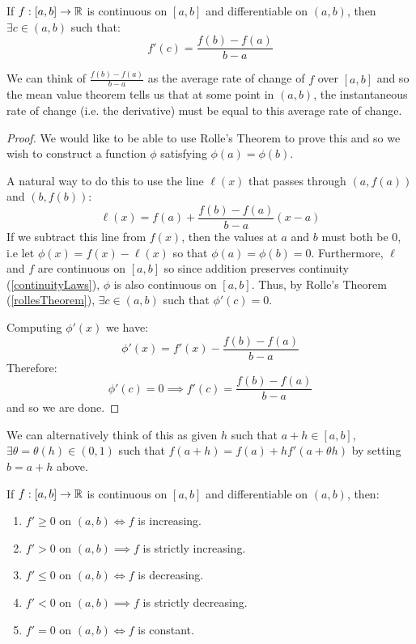 \documentclass[../main.tex]{subfiles}
\begin{document}
\begin{theorem}
  If $f: [a, b] \to \mathbb{R}$ is continuous on $[a, b]$ and differentiable on $(a, b)$, then $\exists c \in (a, b)$ such that:
  \label{MVT}
  \[
    f'(c) = \frac{f(b) - f(a)}{b - a}
  \]
\end{theorem}
\begin{remark}[Intuition]
  We can think of $\frac{f(b) - f(a)}{b - a}$ as the average rate of change of $f$ over $[a, b]$ and so the mean value theorem tells us that at some point in $(a, b)$, the instantaneous rate of change (i.e. the derivative) must be equal to this average rate of change.
\end{remark}
\begin{proof}
  We would like to be able to use Rolle's Theorem to prove this and so we wish to construct a function $\phi$ satisfying $\phi(a) = \phi(b)$.

  A natural way to do this to use the line $\ell(x)$ that passes through $(a, f(a))$ and $(b, f(b))$:
  \[
    \ell(x) = f(a) + \frac{f(b) - f(a)}{b - a}(x - a)
  \]
  If we subtract this line from $f(x)$, then the values at $a$ and $b$ must both be 0, i.e let $\phi(x) = f(x) - \ell(x)$ so that $\phi(a) = \phi(b) = 0$.
  Furthermore, $\ell$ and $f$ are continuous on $[a, b]$ so since addition preserves continuity (\cref{continuityLaws}), $\phi$ is also continuous on $[a, b]$.
  Thus, by Rolle's Theorem (\cref{rollesTheorem}), $\exists c \in (a, b)$ such that $\phi'(c) = 0$.

  Computing $\phi'(x)$ we have:
  \[
    \phi'(x) = f'(x) - \frac{f(b) - f(a)}{b - a}
  \]
  Therefore:
  \[
    \phi'(c) = 0  \implies f'(c) = \frac{f(b) - f(a)}{b - a}
  \]
  and so we are done.
\end{proof}
\begin{remark}
  We can alternatively think of this as given $h$ such that $a + h \in [a, b]$, $\exists \theta = \theta(h) \in (0, 1)$ such that $f(a + h) = f(a) + hf'(a + \theta h)$ by setting $b = a + h$ above.
\end{remark}
\begin{corollary}
  If $f: [a, b] \to \mathbb{R}$ is continuous on $[a, b]$ and differentiable on $(a, b)$, then:
  \label{derivativeIncreasingRelation}
  \begin{enumerate}
    \item $f' \geq 0$ on $(a, b) \iff f$ is increasing.
    \item $f' > 0$ on $(a, b) \implies f$ is strictly increasing.
    \item $f' \leq 0$ on $(a, b) \iff f$ is decreasing.
    \item $f' < 0$ on $(a, b) \implies f$ is strictly decreasing.
    \item $f' = 0$ on $(a, b) \iff f$ is constant.
  \end{enumerate}
\end{corollary}
\end{document}
